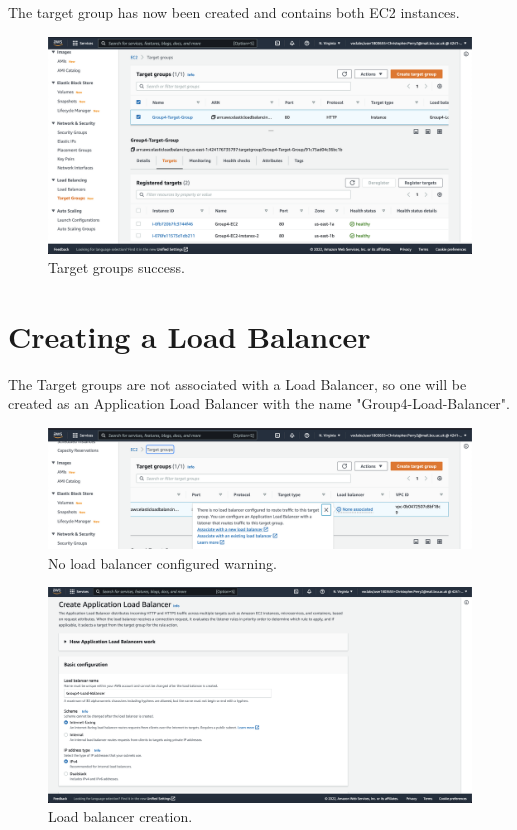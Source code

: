 The target group has now been created and contains both EC2 instances.

\begin{figure}[!htbp]
	  \centering
	  \includegraphics[width=\textwidth]{resources/elb/elb-target-group-created}
	  \caption{Target groups success.}
	  \label{fig:elb-target-group-create}
\end{figure}

\clearpage
\section{Creating a Load Balancer}\label{sec:creating-a-load-balancer}

The Target groups are not associated with a Load Balancer, so one will be created as an Application Load Balancer with
the name "Group4-Load-Balancer".

\begin{figure}[!htbp]
	\centering
	\includegraphics[width=120mm]{resources/elb/elb-load-balancer-creation}
	\caption{No load balancer configured warning.}
	\label{fig:elb-load-bal-create}
\end{figure}

\begin{figure}[!htbp]
	\centering
	\includegraphics[width=120mm]{resources/elb/elb-basic-config}
	\caption{Load balancer creation.}
	\label{fig:elb-creation-config}
\end{figure}

